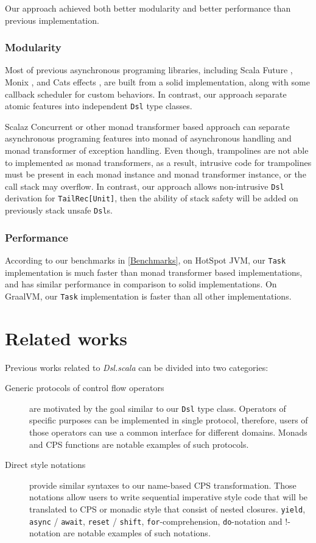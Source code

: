 Our approach achieved both better modularity and better performance than previous implementation.

\subsubsection{Modularity}

Most of previous asynchronous programing libraries, including Scala Future \cite{haller2012sip}, Monix \cite{nedelcu2017monix}, and Cats effects \cite{typelevel2017cats}, are built from a solid implementation, along with some callback scheduler for custom behaviors. In contrast, our approach separate atomic features into independent \lstinline{Dsl} type classes.

Scalaz Concurrent \cite{kenji2017scalaz} or other monad transformer \cite{liang1995monad} based approach can separate asynchronous programing features into monad of asynchronous handling and monad transformer of exception handling. Even though, trampolines are not able to implemented as monad transformers, as a result, intrusive code for trampolines must be present in each monad instance and monad transformer instance, or the call stack may overflow. In contrast, our approach allows non-intrusive \lstinline{Dsl} derivation for \lstinline{TailRec[Unit]}, then the ability of stack safety will be added on previously stack unsafe \lstinline{Dsl}s.


\subsubsection{Performance}
According to our benchmarks in \cref{Benchmarks}, on HotSpot JVM, our \lstinline{Task} implementation is much faster than monad transformer based implementations, and has similar performance in comparison to solid implementations. On GraalVM, our \lstinline{Task} implementation is faster than all other implementations.

\section{Related works}

Previous works related to \textit{Dsl.scala} can be divided into two categories:

\begin{description}
  \item[Generic protocols of control flow operators] are motivated by the goal similar to our \lstinline{Dsl} type class. Operators of specific purposes can be implemented in single protocol, therefore, users of those operators can use a common interface for different domains. Monads and CPS functions are notable examples of such protocols.
  \item[Direct style notations] provide similar syntaxes to our name-based CPS transformation. Those notations allow users to write sequential imperative style code that will be translated to CPS or monadic style that consist of nested closures. \lstinline{yield}, \lstinline{async} / \lstinline{await}, \lstinline{reset} / \lstinline{shift}, \lstinline{for}-comprehension, \lstinline{do}-notation and !-notation are notable examples of such notations.
\end{description}

